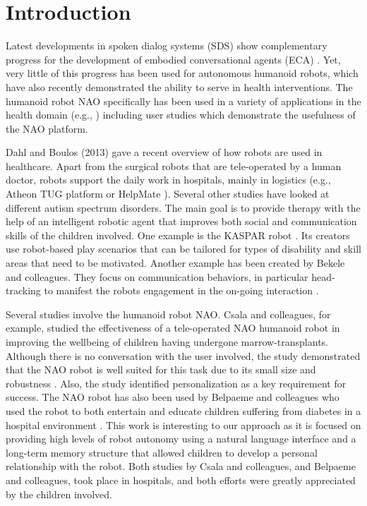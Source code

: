 \documentclass[letterpaper]{article}
\begin{document}
\section{Introduction} \label{intro}

Latest developments in spoken dialog systems (SDS) show complementary progress for the development of  embodied conversational agents (ECA) \cite{YASCLL14}. Yet, very little of
this progress has been used for autonomous humanoid robots, which have also recently demonstrated the ability
to serve in health interventions. The
humanoid robot NAO specifically has been used in a variety of applications in the health domain (e.g.,
\cite{MAJA13}) including user studies which demonstrate the usefulness of the NAO platform.

Dahl and Boulos (2013) \nocite{robotics3010001} gave a recent overview of how robots are used in
healthcare. Apart from the  surgical robots that are tele-operated by a human doctor, robots support
the daily work in hospitals, mainly in logistics (e.g., Atheon TUG platform \cite{bloss2011mobile}
or HelpMate \cite{evans1998helpmate}). Several other studies have looked at different autism
spectrum disorders. The main goal is to provide therapy with the help of an intelligent robotic
agent that improves both social and communication skills of the children involved. One example is
the KASPAR robot \cite{robins2012scenarios}. Its creators use robot-based play scenarios that can
be tailored for types of disability and skill areas that need to be motivated. Another example has
been created by Bekele and colleagues. They focus on communication behaviors, in particular
head-tracking to manifest the robots engagement in the on-going interaction \cite{bekele2013step}.  

Several studies involve the humanoid robot NAO. Csala and colleagues, for example,
studied the effectiveness of a tele-operated NAO humanoid robot in improving the wellbeing of
children having undergone marrow-transplants. Although there is no conversation with the user
involved, the study demonstrated that the NAO robot is well suited for this task due to its small
size and robustness \cite{Csala2012}. Also, the study identified personalization as a key
requirement for success. The NAO robot has also been used by Belpaeme and colleagues who used the
robot to both entertain and educate children suffering from diabetes in a hospital environment
\cite{belpaeme2012multimodal}. This work is interesting to our approach as it is focused on
providing high levels of robot autonomy using a natural language interface and a long-term memory
structure that allowed children to develop a personal relationship with the robot. Both studies by
Csala and colleagues, and Belpaeme and colleagues, took place in hospitals, and both efforts were
greatly appreciated by the children involved.
\end{document}
